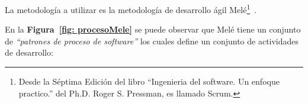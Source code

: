 

La metodología a utilizar es la metodología de desarrollo ágil Melé\footnote{Desde la Séptima Edición del libro ``Ingenieria del software. Un enfoque practico.'' del Ph.D. Roger S. Pressman, es llamado Scrum. }~\cite{7}.

% 
En la \textbf{Figura~\ref{fig: procesoMele}} se puede observar que Melé tiene un conjunto de \emph{``patrones de proceso de software''} los cuales define un conjunto de actividades de desarrollo:

